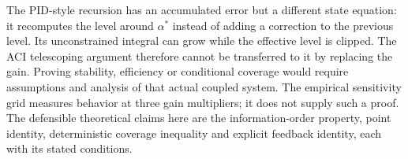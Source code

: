 The PID-style recursion has an accumulated error but a different state equation: it recomputes the level around $\alpha^*$ instead of adding a correction to the previous level. Its unconstrained integral can grow while the effective level is clipped. The ACI telescoping argument therefore cannot be transferred to it by replacing the gain. Proving stability, efficiency or conditional coverage would require assumptions and analysis of that actual coupled system. The empirical sensitivity grid measures behavior at three gain multipliers; it does not supply such a proof. The defensible theoretical claims here are the information-order property, point identity, deterministic coverage inequality and explicit feedback identity, each with its stated conditions.
